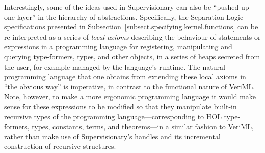\documentclass[a4paper, UKenglish, cleveref, autoref, thm-restate, colorlinks]{lipics-v2021}
\begin{document}
Interestingly, some of the ideas used in Supervisionary can also be ``pushed up one layer'' in the hierarchy of abstractions.
Specifically, the Separation Logic specifications presented in Subsection~\ref{subsect.specifying.kernel.functions} can be re-interpreted as a series of \emph{local axioms} describing the behaviour of statements or expressions in a programming language for registering, manipulating and querying type-formers, types, and other objects, in a series of heaps secreted from the user, for example managed by the language's runtime.
The natural programming language that one obtains from extending these local axioms in ``the obvious way'' is imperative, in contrast to the functional nature of VeriML.
Note, however, to make a more ergonomic programming language it would make sense for these expressions to be modified so that they manipulate built-in recursive types of the programming language---corresponding to HOL type-formers, types, constants, terms, and theorems---in a similar fashion to VeriML, rather than make use of Supervisionary's handles and its incremental construction of recursive structures.
\end{document}
